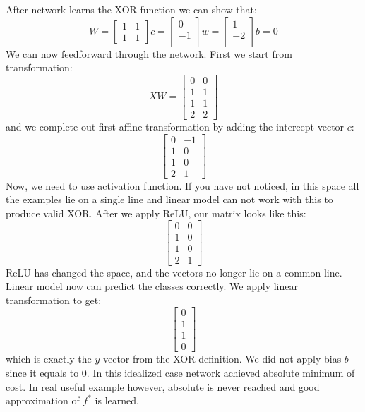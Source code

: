\documentclass[paper=a4, fontsize=11pt]{scrartcl}
\numberwithin{equation}{section}		%
\numberwithin{figure}{section}			%
\numberwithin{table}{section}			%
\begin{document}
	After network learns the XOR function we can show that:
	$$ W = 
	\begin{bmatrix}
	1 & 1 \\
	1 & 1
	\end{bmatrix} 
	c = 
	\begin{bmatrix}
	0 \\
	-1 \\ 
	\end{bmatrix}
	w = 
	\begin{bmatrix}
	1 \\
	-2 \\ 
	\end{bmatrix} b = 0$$
	We can now feedforward through the network. First we start from transformation:
		$$ XW = 
		\begin{bmatrix}
		0 & 0 \\
		1 & 1 \\
		1 & 1 \\
		2 & 2
		\end{bmatrix} $$
	and we complete out first affine transformation by adding the intercept vector $c$:
		$$ 
		\begin{bmatrix}
		0 & -1 \\
		1 & 0 \\
		1 & 0 \\
		2 & 1
		\end{bmatrix} $$
	Now, we need to use activation function. If you have not noticed, in this space all the examples lie on a single line and linear model can not work with this to produce valid XOR.
	After we apply ReLU, our matrix looks like this:
	$$ 
	\begin{bmatrix}
	0 & 0 \\
	1 & 0 \\
	1 & 0 \\
	2 & 1
	\end{bmatrix} $$
	ReLU has changed the space, and the vectors no longer lie on a common line. Linear model now can predict the classes correctly. We apply linear transformation to get:
		$$ 
	\begin{bmatrix}
	0 \\
	1 \\
	1 \\
	0 
	\end{bmatrix} $$
	which is exactly the $y$ vector from the XOR definition. We did not apply bias $b$ since it equals to 0. In this idealized case network achieved absolute minimum of cost. In real useful example however, absolute is never reached and good approximation of $f^*$ is learned.
	
\end{document}
